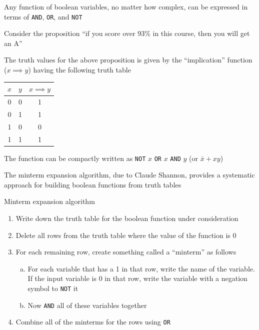 \documentclass[8pt,a4paper,compress]{beamer}
\begin{document}
\begin{frame}[fragile]
\pause

Any function of boolean variables, no matter how complex, can be expressed in terms of \lstinline{AND}, \lstinline{OR}, and \lstinline{NOT}

\pause
\bigskip

Consider the proposition ``if you score over 93\% in this course, then you will get an A''

\pause
\bigskip

The truth values for the above proposition is given by the ``implication'' function ($x \implies y$) having the following truth table

\begin{center}
\begin{tabular}{cc|c}
$x$ & $y$ & $x \implies y$ \\ \hline
0 & 0 & 1 \\
0 & 1 & 1 \\
1 & 0 & 0 \\
1 & 1 & 1
\end{tabular}
\end{center}

\pause
\bigskip

The function can be compactly written as \lstinline{NOT} $x$ \lstinline{OR} $x$ \lstinline{AND} $y$ (or $\bar{x}+xy$)
\end{frame}

\begin{frame}[fragile]
\pause

The minterm expansion algorithm, due to Claude Shannon, provides a systematic approach for building boolean functions from truth tables

\pause
\bigskip

Minterm expansion algorithm
\begin{enumerate}
\item Write down the truth table for the boolean function under consideration

\item Delete all rows from the truth table where the value of the function is 0

\item For each remaining row, create something called a ``minterm'' as follows
\begin{enumerate}[a.]
\item For each variable that has a 1 in that row, write the name of the variable. If the input variable is 0 in that row, write the variable with a negation symbol to \lstinline{NOT} it

\item Now \lstinline{AND} all of these variables together
\end{enumerate}

\item Combine all of the minterms for the rows using \lstinline{OR}
\end{enumerate}
\end{frame}
\end{document}
